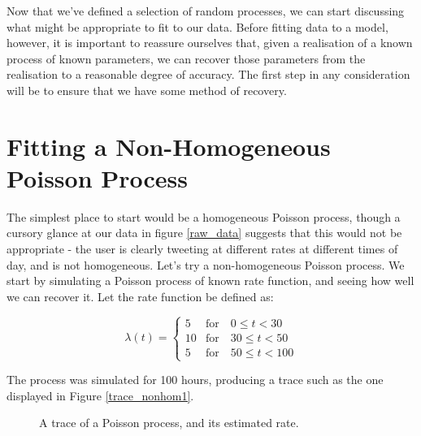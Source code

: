 Now that we've defined a selection of random processes, we can start discussing what might be appropriate to fit to our data. Before fitting data to a model, however, it is important to reassure ourselves that, given a realisation of a known process of known parameters, we can recover those parameters from the realisation to a reasonable degree of accuracy. The first step in any consideration will be to ensure that we have some method of recovery.

\section{Fitting a Non-Homogeneous Poisson Process}

The simplest place to start would be a homogeneous Poisson process, though a cursory glance at our data in figure \ref{raw_data} suggests that this would not be appropriate - the user is clearly tweeting at different rates at different times of day, and is not homogeneous. Let's try a non-homogeneous Poisson process. We start by simulating a Poisson process of known rate function, and seeing how well we can recover it. Let the rate function be defined as:

$$
\lambda(t) = 
\begin{cases}
5  & \mbox{for} \quad 0  \leqslant t < 30\\
10 & \mbox{for} \quad 30 \leqslant t < 50\\
5  & \mbox{for} \quad 50 \leqslant t < 100
\end{cases}
$$

The process was simulated for 100 hours, producing a trace such as the one displayed in Figure \ref{trace_nonhom1}.

\begin{figure}
\centering
{}
\caption{A trace of a Poisson process, and its estimated rate.}

\end{figure}


